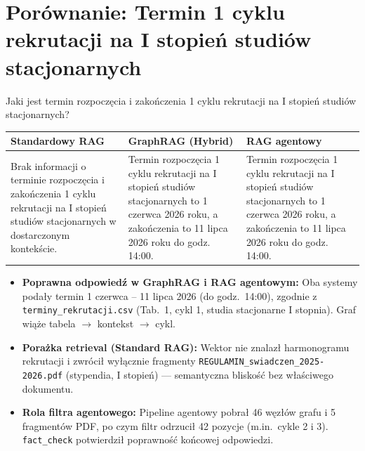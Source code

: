 
\section*{Porównanie: Termin 1 cyklu rekrutacji na I stopień studiów stacjonarnych}

\begin{tcolorbox}[colback=blue!5!white,colframe=blue!75!black,title=Pytanie użytkownika]
    Jaki jest termin rozpoczęcia i zakończenia 1 cyklu rekrutacji na I stopień studiów stacjonarnych?
\end{tcolorbox}

\noindent
\begin{tabularx}{\textwidth}{@{} >{\raggedright\arraybackslash}X >{\raggedright\arraybackslash}X >{\raggedright\arraybackslash}X @{}}
    \toprule
    \textbf{Standardowy RAG} & \textbf{GraphRAG (Hybrid)} & \textbf{RAG agentowy} \\
    \midrule
    \footnotesize Brak informacji o terminie rozpoczęcia i zakończenia 1 cyklu rekrutacji na I stopień studiów stacjonarnych w dostarczonym kontekście. & \footnotesize Termin rozpoczęcia 1 cyklu rekrutacji na I stopień studiów stacjonarnych to 1 czerwca 2026 roku, a zakończenia to 11 lipca 2026 roku do godz. 14:00. & \footnotesize Termin rozpoczęcia 1 cyklu rekrutacji na I stopień studiów stacjonarnych to 1 czerwca 2026 roku, a zakończenia to 11 lipca 2026 roku do godz. 14:00. \\
    \bottomrule
\end{tabularx}

\begin{tcolorbox}[colback=green!5!white,colframe=green!50!black,title=Wnioski i obserwacje]
    \begin{itemize}
        \item \textbf{Poprawna odpowiedź w GraphRAG i RAG agentowym:} Oba systemy podały termin 1 czerwca -- 11 lipca 2026 (do godz.\ 14:00), zgodnie z \texttt{terminy\_rekrutacji.csv} (Tab.\ 1, cykl 1, studia stacjonarne I stopnia). Graf wiąże tabela $\rightarrow$ kontekst $\rightarrow$ cykl.
        \item \textbf{Porażka retrieval (Standard RAG):} Wektor nie znalazł harmonogramu rekrutacji i zwrócił wyłącznie fragmenty \texttt{REGULAMIN\_swiadczen\_2025-2026.pdf} (stypendia, I stopień) --- semantyczna bliskość bez właściwego dokumentu.
        \item \textbf{Rola filtra agentowego:} Pipeline agentowy pobrał 46 węzłów grafu i 5 fragmentów PDF, po czym filtr odrzucił 42 pozycje (m.in.\ cykle 2 i 3). \texttt{fact\_check} potwierdził poprawność końcowej odpowiedzi.
    \end{itemize}
\end{tcolorbox}
\vspace{1em}

